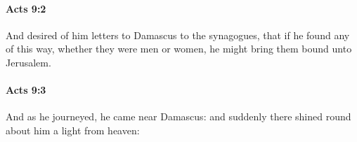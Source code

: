 		\paragraph{Acts 9:2} %
			\label{ACTS-9-2}

			And desired of him letters to Damascus to the synagogues, that if he found any of this way, whether they were men or women, he might bring them bound unto Jerusalem.

			\begin{framed}
			\scriptsize
				\begin{compactdesc}
					\item[SBLG] 
				\end{compactdesc}
			\end{framed}

		\paragraph{Acts 9:3} %
			\label{ACTS-9-3}

			And as he journeyed, he came near Damascus: and suddenly there shined round about him a light from heaven:

